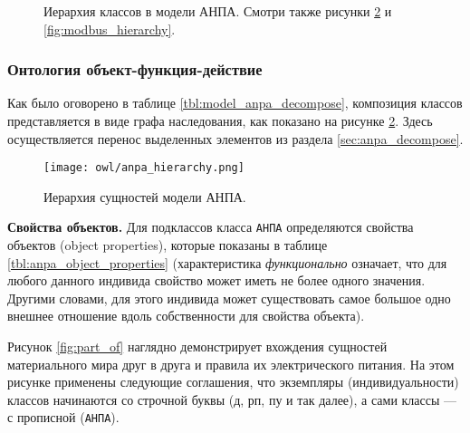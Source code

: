 \begin{center}
    \begin{figure}[ht!]
    \caption{Иерархия классов в модели АНПА. Смотри также рисунки \ref{fig:anpa_hierarchy} и \ref{fig:modbus_hierarchy}.}\label{fig:common_classs_hierarchy}
    \end{figure}
\end{center}



\subsubsection{Онтология объект-функция-действие}
Как было оговорено в таблице \ref{tbl:model_anpa_decompose}, композиция классов представляется в виде графа наследования,
как показано на рисунке \ref{fig:anpa_hierarchy}. Здесь осуществляется перенос выделенных элементов из раздела \ref{sec:anpa_decompose}.

\begin{center}
    \begin{figure}[ht!]
        \texttt{[image: owl/anpa\_hierarchy.png]}
        \caption{Иерархия сущностей модели АНПА.}\label{fig:anpa_hierarchy}
    \end{figure}
\end{center}


\textbf{Свойства объектов.}
Для подклассов класса \texttt{АНПА} определяются свойства объектов (object properties), которые показаны в таблице \ref{tbl:anpa_object_properties}
(характеристика \textit{функционально} означает, что для любого данного индивида свойство может иметь не более одного значения. 
Другими словами, для этого индивида может существовать самое большое одно внешнее отношение вдоль собственности для свойства объекта).
%

Рисунок \ref{fig:part_of} наглядно демонстрирует вхождения сущностей материального мира друг в друга и правила их электрического питания.
На этом рисунке применены следующие соглашения, что экземпляры (индивидуальности) классов начинаются со строчной буквы (д, рп, пу и так далее),
а сами классы --- с прописной (\texttt{АНПА}).

